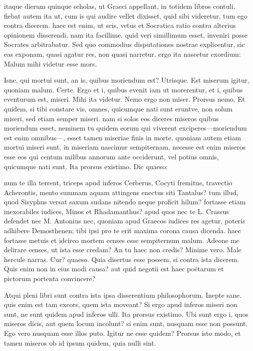  itaque dierum quinque scholas, ut Graeci appellant, in totidem libros contuli. fiebat autem ita ut, cum is qui audire vellet dixisset, quid sibi videretur, tum ego contra dicerem. haec est enim, ut scis, vetus et Socratica ratio contra alterius opinionem disserendi. nam ita facillime, quid veri simillimum esset, inveniri posse Socrates arbitrabatur. Sed quo commodius disputationes nostrae explicentur, sic eas exponam, quasi agatur res, non quasi narretur. ergo ita nascetur exordium: Malum mihi videtur esse mors.

 Isne, qui mortui sunt, an is, quibus moriendum est? Utrisque. Est miserum igitur, quoniam malum. Certe. Ergo et i, quibus evenit iam ut morerentur, et i, quibus eventurum est, miseri. Mihi ita videtur. Nemo ergo non miser. Prorsus nemo. Et quidem, si tibi constare vis, omnes, quicumque nati sunt eruntve, non solum miseri, sed etiam semper miseri. nam si solos eos diceres miseros quibus moriendum esset, neminem tu quidem eorum qui viverent exciperes—moriendum est enim omnibus—, esset tamen miseriae finis in morte. quoniam autem etiam mortui miseri sunt, in miseriam nascimur sempiternam. necesse est enim miseros esse eos qui centum milibus annorum ante occiderunt, vel potius omnis, quicumque nati sunt. Ita prorsus existimo. Dic quaeso:

 num te illa terrent, triceps apud inferos Cerberus, Cocyti fremitus, travectio Acherontis, mento summam aquam attingens enectus siti Tantalus? tum illud, quod Sisyphus versat saxum sudans nitendo neque proficit hilum? fortasse etiam inexorabiles iudices, Minos et Rhadamanthus? apud quos nec te L. Crassus defendet nec M. Antonius nec, quoniam apud Graecos iudices res agetur, poteris adhibere Demosthenen; tibi ipsi pro te erit maxima corona causa dicenda. haec fortasse metuis et idcirco mortem censes esse sempiternum malum. Adeone me delirare censes, ut ista esse credam? An tu haec non credis? Minime vero. Male hercule narras. Cur? quaeso. Quia disertus esse possem, si contra ista dicerem. Quis enim non in eius modi causa? aut quid negotii est haec poëtarum et pictorum portenta convincere?

 Atqui pleni libri sunt contra ista ipsa disserentium philosophorum. Inepte sane. quis enim est tam excors, quem ista moveant? Si ergo apud inferos miseri non sunt, ne sunt quidem apud inferos ulli. Ita prorsus existimo. Ubi sunt ergo i, quos miseros dicis, aut quem locum incolunt? si enim sunt, nusquam esse non possunt. Ego vero nusquam esse illos puto. Igitur ne esse quidem? Prorsus isto modo, et tamen miseros ob id ipsum quidem, quia nulli sint.

